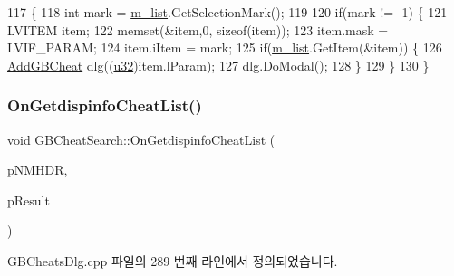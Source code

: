 \begin{DoxyCode}
117 \{
118   \textcolor{keywordtype}{int} mark = \mbox{\hyperlink{class_g_b_cheat_search_a4385c178810aafb751e2bbc80a1a67c3}{m\_list}}.GetSelectionMark();
119   
120   \textcolor{keywordflow}{if}(mark != -1) \{
121     LVITEM item;
122     memset(&item,0, \textcolor{keyword}{sizeof}(item));
123     item.mask = LVIF\_PARAM;
124     item.iItem = mark;
125     \textcolor{keywordflow}{if}(\mbox{\hyperlink{class_g_b_cheat_search_a4385c178810aafb751e2bbc80a1a67c3}{m\_list}}.GetItem(&item)) \{
126       \mbox{\hyperlink{class_add_g_b_cheat}{AddGBCheat}} dlg((\mbox{\hyperlink{_system_8h_a10e94b422ef0c20dcdec20d31a1f5049}{u32}})item.lParam);
127       dlg.DoModal();
128     \}
129   \}
130 \}
\end{DoxyCode}
\mbox{\label{class_g_b_cheat_search_ae7ab3b9b14715f3984bdef66ed321e1f}} 
\subsubsection{\texorpdfstring{On\+Getdispinfo\+Cheat\+List()}{OnGetdispinfoCheatList()}}
{\footnotesize\ttfamily void G\+B\+Cheat\+Search\+::\+On\+Getdispinfo\+Cheat\+List (\begin{DoxyParamCaption}\item[{N\+M\+H\+DR $\ast$}]{p\+N\+M\+H\+DR,  }\item[{L\+R\+E\+S\+U\+LT $\ast$}]{p\+Result }\end{DoxyParamCaption})\hspace{0.3cm}{\ttfamily [protected]}}



G\+B\+Cheats\+Dlg.\+cpp 파일의 289 번째 라인에서 정의되었습니다.


